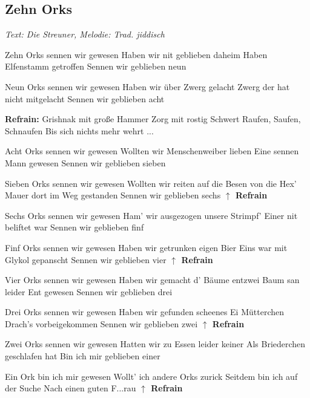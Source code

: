 \documentclass[a5paper,pagesize,twoside,10pt,headings=small]{scrreprt}
\newcommand\songheader[3][]{%
  \clearpage%
    \subsection*{\centering #2}\vspace{0.5\baselineskip}%
    \addcontentsline{toc}{subsection}{#2}
    \centering \textit{#3}\\%
    \vspace{\baselineskip}\par%
}
\newcommand\Definepart[1]{\textbf{#1}\xspace}
\newcommand\Repeatpart[1]{\textbf{\ensuremath{\uparrow} #1}\vspace{-1.0\baselineskip}\xspace}
\newcommand\Refrain{\Repeatpart{Refrain}}
\newcommand\Refraindef{\Definepart{Refrain:}}
\begin{document}
\songheader{Zehn Orks}{Text: Die Streuner, Melodie: Trad. jiddisch}
\begin{multicols*}{2}
\begin{guitar}
Zehn Orks sennen wir gewesen
Haben wir nit geblieben daheim
Haben Elfenstamm getroffen
Sennen wir geblieben neun

Neun Orks sennen wir gewesen
Haben wir über Zwerg gelacht
Zwerg der hat nicht mitgelacht
Sennen wir geblieben acht

\Refraindef
Grishnak mit große Hammer
Zorg mit rostig Schwert
Raufen, Saufen, Schnaufen
Bis sich nichts mehr wehrt ...

Acht Orks sennen wir gewesen
Wollten wir Menschenweiber lieben
Eine sennen Mann gewesen
Sennen wir geblieben sieben

Sieben Orks sennen wir gewesen
Wollten wir reiten auf die Besen von die Hex'
Mauer dort im Weg gestanden
Sennen wir geblieben sechs
\Refrain

\columnbreak

Sechs Orks sennen wir gewesen
Ham' wir ausgezogen unsere Strimpf'
Einer nit beliftet war
Sennen wir geblieben finf

Finf Orks sennen wir gewesen
Haben wir getrunken eigen Bier
Eins war mit Glykol gepanscht
Sennen wir geblieben vier
\Refrain

Vier Orks sennen wir gewesen
Haben wir gemacht d' Bäume entzwei
Baum san leider Ent gewesen
Sennen wir geblieben drei

Drei Orks sennen wir gewesen
Haben wir gefunden scheenes Ei
Mütterchen Drach's vorbeigekommen
Sennen wir geblieben zwei
\Refrain

Zwei Orks sennen wir gewesen
Hatten wir zu Essen leider keiner
Als Briederchen geschlafen hat
Bin ich mir geblieben einer

Ein Ork bin ich mir gewesen
Wollt' ich andere Orks zurick
Seitdem bin ich auf der Suche
Nach einen guten F...rau
\Refrain
\end{guitar}
\end{multicols*}
\end{document}
